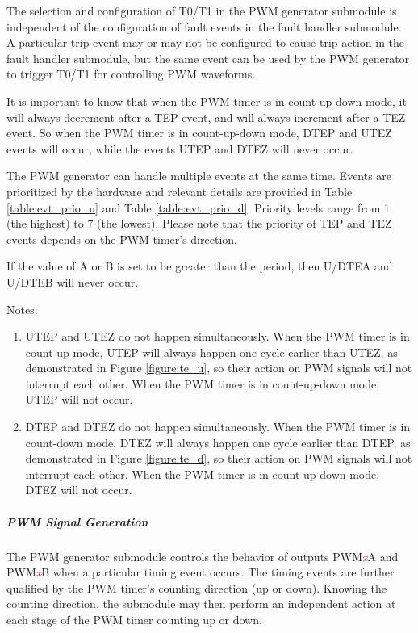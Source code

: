 \documentclass[main\_\_EN.tex]{subfiles}
\begin{document}
The selection and configuration of T0/T1 in the PWM generator submodule is independent of the configuration of fault events in the fault handler submodule. A particular trip event may or may not be configured to cause trip action in the fault handler submodule, but the same event can be used by the PWM generator to trigger T0/T1 for controlling PWM waveforms.

It is important to know that when the PWM timer is in count-up-down mode, it will always decrement after a TEP event, and will always increment after a TEZ event. So when the PWM timer is in count-up-down mode, DTEP and UTEZ events will occur, while the events UTEP and DTEZ will never occur.

The PWM generator can handle multiple events at the same time. Events are prioritized by the hardware and relevant details are provided in Table \ref{table:evt_prio_u} and Table \ref{table:evt_prio_d}. Priority levels range from 1 (the highest) to 7 (the lowest). Please note that the priority of TEP and TEZ events depends on the PWM timer's direction.

If the value of A or B is set to be greater than the period, then U/DTEA and U/DTEB will never occur.




Notes:
\begin{enumerate}
   \item UTEP and UTEZ do not happen simultaneously. When the PWM timer is in count-up mode, UTEP will always happen one cycle earlier than UTEZ, as demonstrated in Figure \ref{figure:te_u}, so their action on PWM signals will not interrupt each other. When the PWM timer is in count-up-down mode, UTEP will not occur.
    \item DTEP and DTEZ do not happen simultaneously. When the PWM timer is in count-down mode, DTEZ will always happen one cycle earlier than DTEP, as demonstrated in Figure \ref{figure:te_d}, so their action on PWM signals will not interrupt each other. When the PWM timer is in count-up-down mode, DTEZ will not occur.
\end{enumerate}

\subparagraph{PWM Signal Generation}
The PWM generator submodule controls the behavior of outputs PWM\textcolor{red}{\it{x}}A and PWM\textcolor{red}{\it{x}}B when a particular timing event occurs. The timing events are further qualified by the PWM timer's counting direction (up or down). Knowing the counting direction, the submodule may then perform an independent action at each stage of the PWM timer counting up or down.
\end{document}
